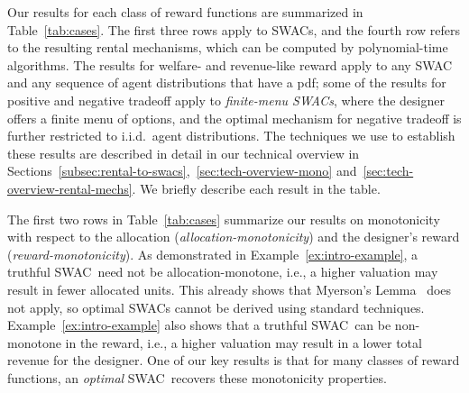 \documentclass[11pt,letterpaper]{article}
\newcommand{\amono}{allocation-monotone\xspace}
\newcommand{\swac}{SWAC\xspace}
\newcommand{\swacs}{SWACs\xspace}
\newcommand{\finaucs}{finite-menu \swacs}
\theoremstyle{plain}
\begin{document}
\begin{table}[h!]
\caption[Informal Summary of Our Results]{Informal Summary of Our Results \\
* For these reward functions, some of the allocation-monotonicity results are restricted to finite-menu auctions, where the bidders are offered a \emph{finite} menu of options to choose from. 
The other results for these reward functions hold for any \swac\ that is \amono.\\
\dag Except for a possible set of measure zero.\\
\ddag This algorithm is restricted to i.i.d.\ distributions.
}
\label{tab:cases}
\end{table}

Our results for each class of reward functions are summarized in Table~\ref{tab:cases}. 
The first three rows apply to \swacs,
and the fourth row
refers to
the resulting rental mechanisms,
which can be computed by polynomial-time algorithms.
The results for welfare- and revenue-like reward
apply to any \swac and any sequence of agent distributions that have a pdf;
some of the results for positive and negative tradeoff apply to \emph{\finaucs}, where the designer offers a finite menu of options,
and the optimal mechanism for negative tradeoff is further restricted to i.i.d.\ agent distributions.
The techniques we use to establish these results are described in detail in our technical overview in Sections~\ref{subsec:rental-to-swacs},~\ref{sec:tech-overview-mono} and~\ref{sec:tech-overview-rental-mechs}.
We briefly describe each result in the table.

The first two rows in Table~\ref{tab:cases} summarize our results on monotonicity with respect to the allocation (\emph{allocation-monotonicity}) and the designer's reward (\emph{reward-monotonicity}).
As demonstrated in Example~\ref{ex:intro-example}, a truthful \swac\ need not be allocation-monotone, i.e., a higher valuation may result in 
fewer allocated units. 
This already shows that Myerson's Lemma~\cite{myerson1981optimal} does not apply, so optimal \swacs cannot be derived using standard techniques.
Example~\ref{ex:intro-example} also shows that a truthful \swac\ can be non-monotone in the reward, i.e., a higher valuation
may result in a lower total 
revenue
for the designer.
One of our key results is that for many classes of reward functions, an \emph{optimal} \swac\ recovers these monotonicity properties. 
\end{document}
